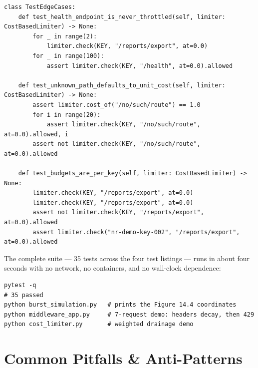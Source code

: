 \begin{verbatim}
class TestEdgeCases:
    def test_health_endpoint_is_never_throttled(self, limiter: CostBasedLimiter) -> None:
        for _ in range(2):
            limiter.check(KEY, "/reports/export", at=0.0)
        for _ in range(100):
            assert limiter.check(KEY, "/health", at=0.0).allowed

    def test_unknown_path_defaults_to_unit_cost(self, limiter: CostBasedLimiter) -> None:
        assert limiter.cost_of("/no/such/route") == 1.0
        for i in range(20):
            assert limiter.check(KEY, "/no/such/route", at=0.0).allowed, i
        assert not limiter.check(KEY, "/no/such/route", at=0.0).allowed

    def test_budgets_are_per_key(self, limiter: CostBasedLimiter) -> None:
        limiter.check(KEY, "/reports/export", at=0.0)
        limiter.check(KEY, "/reports/export", at=0.0)
        assert not limiter.check(KEY, "/reports/export", at=0.0).allowed
        assert limiter.check("nr-demo-key-002", "/reports/export", at=0.0).allowed
\end{verbatim}

The complete suite --- 35 tests across the four test listings --- runs in
about four seconds with no network, no containers, and no wall-clock
dependence:

\begin{verbatim}
pytest -q
# 35 passed
python burst_simulation.py   # prints the Figure 14.4 coordinates
python middleware_app.py     # 7-request demo: headers decay, then 429
python cost_limiter.py       # weighted drainage demo
\end{verbatim}
\section{Common Pitfalls \& Anti-Patterns}
\label{sec:ch14-pitfalls}

